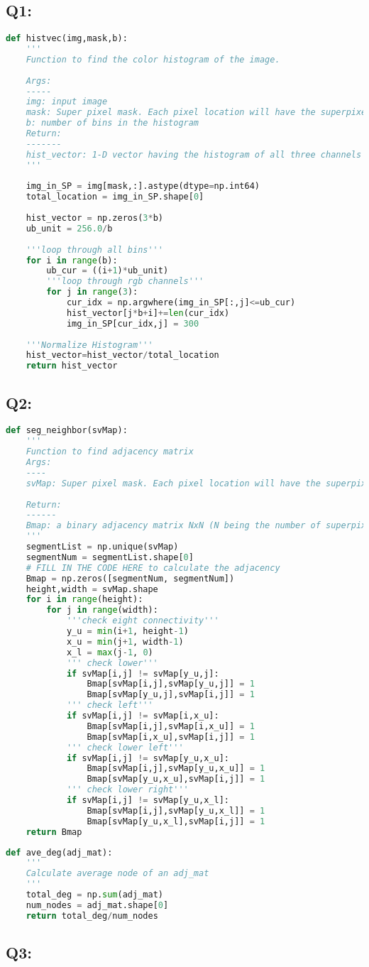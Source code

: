 \documentclass[12pt]{article}
\begin{document}
\subsection*{Q1:}
\begin{lstlisting}[language=python]
def histvec(img,mask,b):
	'''
	Function to find the color histogram of the image.
	
	Args:
	-----
	img: input image
	mask: Super pixel mask. Each pixel location will have the superpixel label corresponding to it
	b: number of bins in the histogram
	Return:
	-------
	hist_vector: 1-D vector having the histogram of all three channels appended
	'''
	
	img_in_SP = img[mask,:].astype(dtype=np.int64)
	total_location = img_in_SP.shape[0]
	
	hist_vector = np.zeros(3*b)
	ub_unit = 256.0/b
	
	'''loop through all bins'''
	for i in range(b):
		ub_cur = ((i+1)*ub_unit)
		'''loop through rgb channels'''
		for j in range(3):
			cur_idx = np.argwhere(img_in_SP[:,j]<=ub_cur)
			hist_vector[j*b+i]+=len(cur_idx)
			img_in_SP[cur_idx,j] = 300
	
	'''Normalize Histogram'''
	hist_vector=hist_vector/total_location    
	return hist_vector
\end{lstlisting}
\pagebreak
\subsection*{Q2:}
\begin{lstlisting}[language=Python]
def seg_neighbor(svMap):
	'''
	Function to find adjacency matrix
	Args:
	----
	svMap: Super pixel mask. Each pixel location will have the superpixel label corresponding to it.  
	
	Return:
	------
	Bmap: a binary adjacency matrix NxN (N being the number of superpixels	in svMap). 
	'''
	segmentList = np.unique(svMap)
	segmentNum = segmentList.shape[0]
	# FILL IN THE CODE HERE to calculate the adjacency
	Bmap = np.zeros([segmentNum, segmentNum])
	height,width = svMap.shape
	for i in range(height):
		for j in range(width):
			'''check eight connectivity'''
			y_u = min(i+1, height-1) 
			x_u = min(j+1, width-1)
			x_l = max(j-1, 0)
			''' check lower'''
			if svMap[i,j] != svMap[y_u,j]: 
				Bmap[svMap[i,j],svMap[y_u,j]] = 1
				Bmap[svMap[y_u,j],svMap[i,j]] = 1
			''' check left'''
			if svMap[i,j] != svMap[i,x_u]:
				Bmap[svMap[i,j],svMap[i,x_u]] = 1
				Bmap[svMap[i,x_u],svMap[i,j]] = 1
			''' check lower left'''
			if svMap[i,j] != svMap[y_u,x_u]:
				Bmap[svMap[i,j],svMap[y_u,x_u]] = 1
				Bmap[svMap[y_u,x_u],svMap[i,j]] = 1
			''' check lower right'''
			if svMap[i,j] != svMap[y_u,x_l]:
				Bmap[svMap[i,j],svMap[y_u,x_l]] = 1
				Bmap[svMap[y_u,x_l],svMap[i,j]] = 1
	return Bmap
\end{lstlisting}
\pagebreak	
\begin{lstlisting}[language=Python]	
def ave_deg(adj_mat):
	'''
	Calculate average node of an adj_mat
	'''
	total_deg = np.sum(adj_mat)
	num_nodes = adj_mat.shape[0]
	return total_deg/num_nodes
\end{lstlisting}
\vspace{3em}
\subsection*{Q3:}
\end{document}
